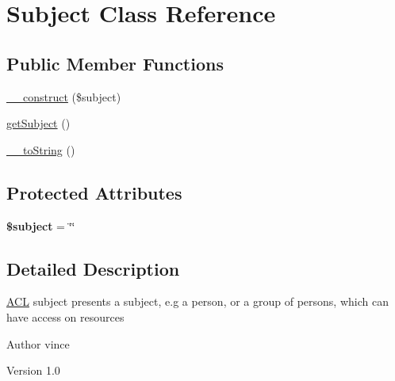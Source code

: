 \hypertarget{class_anemo_1_1_a_c_l_1_1_subject}{
\section{Subject Class Reference}
\label{class_anemo_1_1_a_c_l_1_1_subject}
}
\subsection*{Public Member Functions}
\begin{DoxyCompactItemize}
\item 
\hyperlink{class_anemo_1_1_a_c_l_1_1_subject_af80899555977d5debbe6ebb995441708}{\_\-\_\-construct} (\$subject)
\item 
\hyperlink{class_anemo_1_1_a_c_l_1_1_subject_a7ec8f5b794ded8f3c0df9afd96c8233c}{getSubject} ()
\item 
\hyperlink{class_anemo_1_1_a_c_l_1_1_subject_a7516ca30af0db3cdbf9a7739b48ce91d}{\_\-\_\-toString} ()
\end{DoxyCompactItemize}
\subsection*{Protected Attributes}
\begin{DoxyCompactItemize}
\item 
\hypertarget{class_anemo_1_1_a_c_l_1_1_subject_afea90503726cd5ad2eb80baf0b6d217d}{
{\bfseries \$subject} = \char`\"{}\char`\"{}}
\label{class_anemo_1_1_a_c_l_1_1_subject_afea90503726cd5ad2eb80baf0b6d217d}

\end{DoxyCompactItemize}


\subsection{Detailed Description}
\hyperlink{class_anemo_1_1_a_c_l}{ACL} subject presents a subject, e.g a person, or a group of persons, which can have access on resources \begin{DoxyAuthor}{Author}
vince 
\end{DoxyAuthor}
\begin{DoxyVersion}{Version}
1.0 
\end{DoxyVersion}


